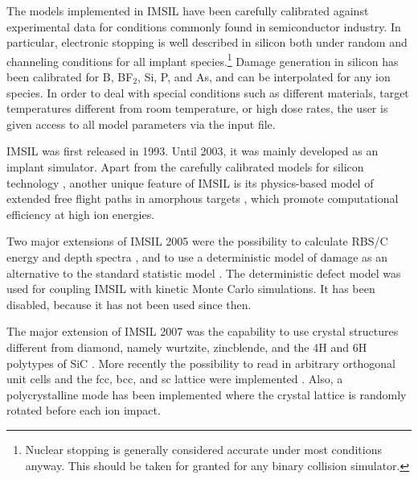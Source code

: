 The models implemented in IMSIL have been carefully calibrated against
experimental data for conditions commonly found in semiconductor industry.  In
particular, electronic stopping is well described in silicon both under random
and channeling conditions for all implant species.\footnote{Nuclear stopping is
generally considered accurate under most conditions anyway. This should be taken
for granted for any binary collision simulator.}  Damage generation in silicon
has been calibrated for B, BF$_2$, Si, P, and As, and can be interpolated for
any ion species.  In order to deal with special conditions such as different
materials, target temperatures different from room temperature, or high dose
rates, the user is given access to all model parameters via the input file.

IMSIL was first released in 1993. Until 2003, it was mainly developed as an
implant simulator. Apart from the carefully calibrated models for silicon
technology \cite{hobler_monte_1995, simionescu_model_1995, hobler_towards_2000,
hobler_status_2003}, another unique feature of IMSIL is its physics-based model
of extended free flight paths in amorphous targets
\cite{hobler_acceleration_1995}, which promote computational efficiency at high
ion energies.

Two major extensions of IMSIL 2005 were the possibility to calculate RBS/C
energy and depth spectra \cite{kovac_investigation_2006}, and to use a
deterministic model of damage as an alternative to the standard statistic model
\cite{hobler_multiscale_2005,otto_coupled_2005}. The deterministic defect model
was used for coupling IMSIL with kinetic Monte Carlo simulations. It has
been disabled, because it has not been used since then. 

The major extension of IMSIL 2007 was the capability to use crystal structures 
different from diamond, namely wurtzite, zincblende, and the 4H and 6H
polytypes of SiC \cite{g._hobler_simulation_2018}. More recently the
possibility to read in arbitrary orthogonal unit cells and the fcc, bcc, and sc lattice
were implemented \cite{schlueter_absence_2020}. Also, a polycrystalline mode has 
been implemented \cite{schlueter_absence_2020} where the crystal lattice is
randomly rotated before each ion impact.

